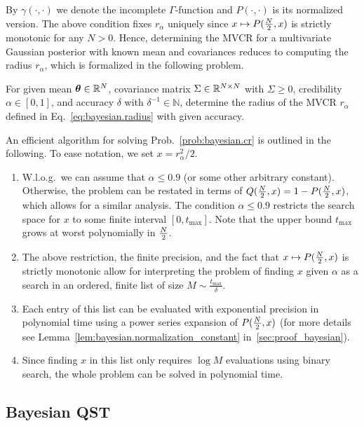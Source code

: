 By $\gamma(\cdot,\cdot)$ we denote the incomplete $\Gamma$-function and $P(\cdot,\cdot)$ is its normalized version.
The above condition fixes $r_{\alpha}$ uniquely since $x \mapsto P(\tfrac{N}{2}, x)$ is strictly monotonic for any $N > 0$.
Hence, determining the MVCR for a multivariate Gaussian posterior with known mean and covariances reduces to computing the radius $r_\alpha$, which is formalized in the following problem.
\begin{problem}\label{prob:bayesian.cr}
  For given mean $\boldsymbol{\theta} \in \mathbb{R}^N$, covariance matrix $\Sigma \in \mathbb{R}^{N \times N}$ with $\Sigma \geq 0$, credibility $\alpha \in [0,1]$, and accuracy $\delta$ with $\delta^{-1} \in \mathbb{N}$, determine the radius of the MVCR $r_{\alpha}$ defined in Eq.~\eqref{eq:bayesian.radius} with given accuracy.
\end{problem}

An efficient algorithm for solving Prob.~\ref{prob:bayesian.cr} is outlined in the following.
To ease notation, we set $x = r^2_{\alpha}/2$.
\begin{enumerate}
  \item W.l.o.g.\ we can assume that $\alpha \le 0.9$ (or some other arbitrary constant).
  Otherwise, the problem can be restated in terms of $Q(\tfrac{N}{2}, x) = 1 - P(\tfrac{N}{2}, x)$, which allows for a similar analysis.
  The condition $\alpha \le 0.9$ restricts the search space for $x$ to some finite interval $[0, t_\mathrm{max}]$.
  Note that the upper bound $t_\mathrm{max}$ grows at worst polynomially in $\tfrac{N}{2}$.
  \item The above restriction, the finite precision, and the fact that $x \mapsto P(\tfrac{N}{2}, x)$ is strictly monotonic allow for interpreting the problem of finding $x$ given $\alpha$ as a search in an ordered, finite list of size $M \sim \tfrac{t_\mathrm{max}}{\delta}$.
  \item Each entry of this list can be evaluated with exponential precision in polynomial time using a power series expansion of $P(\tfrac{N}{2}, x)$ (for more details see Lemma~\ref{lem:bayesian.normalization_constant} in~\ref{sec:proof_bayesian}).
  \item Since finding $x$ in this list only requires $\log M$ evaluations using binary search, the whole problem can be solved in polynomial time.
\end{enumerate}


\subsection{Bayesian QST}
\label{sub:bayesian.tomography}


